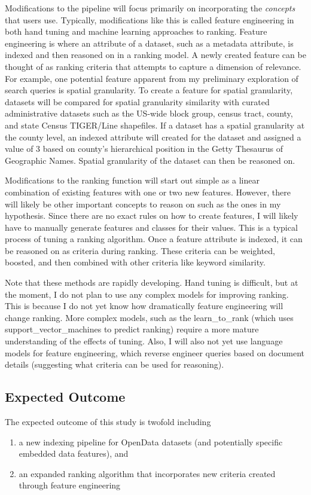 Modifications to the pipeline will focus primarily on incorporating the \emph{concepts} that users use. Typically, modifications like this is called feature engineering in both hand tuning and machine learning approaches to ranking. Feature engineering is where an attribute of a dataset, such as a metadata attribute, is indexed and then reasoned on in a ranking model. A newly created feature can be thought of as ranking criteria that attempts to capture a dimension of relevance. For example, one potential feature apparent from my preliminary exploration of search queries is spatial granularity. To create a feature for spatial granularity, datasets will be compared for spatial granularity similarity with curated administrative datasets such as the US-wide block group, census tract, county, and state Census TIGER/Line shapefiles. If a dataset has a spatial granularity at the county level, an indexed attribute will created for the dataset and assigned a value of 3 based on county’s hierarchical position in the Getty Thesaurus of Geographic Names. Spatial granularity of the dataset can then be reasoned on.

Modifications to the ranking function will start out simple as a linear combination of existing features with one or two new features. However, there will likely be other important concepts to reason on such as the ones in my hypothesis. Since there are no exact rules on how to create features, I will likely have to manually generate features and classes for their values. This is a typical process of tuning a ranking algorithm. Once a feature attribute is indexed, it can be reasoned on as criteria during ranking. These criteria can be weighted, boosted, and then combined with other criteria like keyword similarity.

Note that these methods are rapidly developing. Hand tuning is difficult, but at the moment, I do not plan to use any complex models for improving ranking. This is because I do not yet know how dramatically feature engineering will change ranking. More complex models, such as the \gls{learn_to_rank} (which uses \gls{support_vector_machines} to predict ranking) require a more mature understanding of the effects of tuning. Also, I will also not yet use language models for feature engineering, which reverse engineer queries based on document details (suggesting what criteria can be used for reasoning).

\subsection{Expected Outcome}
The expected outcome of this study is twofold including
\begin{enumerate}
    \item a new indexing pipeline for OpenData datasets (and potentially specific embedded data features), and 
    \item an expanded ranking algorithm that incorporates new criteria created through feature engineering
\end{enumerate}

